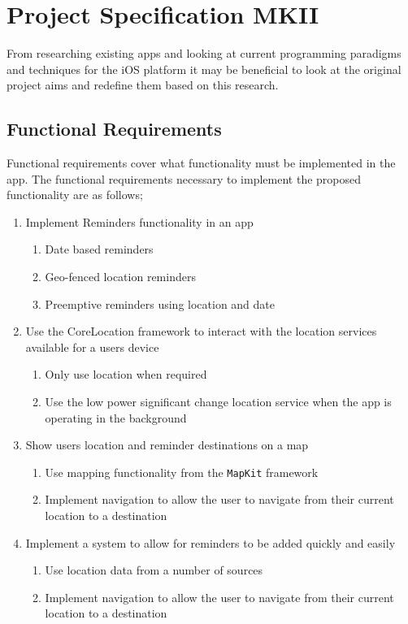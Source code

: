 \documentclass[12pt]{report}
\begin{document}
\chapter{Project Specification MKII}

From researching existing apps and looking at current programming paradigms and techniques for the iOS platform it may be beneficial to look at the original project aims and redefine them based on this research.

\section{Functional Requirements}

Functional requirements cover what functionality must be implemented in the app. The functional requirements necessary to implement the proposed functionality are as follows;

\begin{enumerate}[label*=\arabic*.]

\item{Implement Reminders functionality in an app}
    \begin{enumerate}[label*=\arabic*.]
        \item{Date based reminders}
        \item{Geo-fenced location reminders}
        \item{Preemptive reminders using location and date}
    \end{enumerate}
    
\item{Use the CoreLocation framework to interact with the location services available for a users device}
    \begin{enumerate}[label*=\arabic*.]
        \item{Only use location when required}
        \item{Use the low power significant change location service when the app is operating in the background}
    \end{enumerate}
    
\item{Show users location and reminder destinations on a map}
    \begin{enumerate}[label*=\arabic*.]
        \item{Use mapping functionality from the \texttt{MapKit} framework}
        \item{Implement navigation to allow the user to navigate from their current location to a destination}
    \end{enumerate}
   
\item{Implement a system to allow for reminders to be added quickly and easily}
    \begin{enumerate}[label*=\arabic*.]
        \item{Use location data from a number of sources}
        \item{Implement navigation to allow the user to navigate from their current location to a destination}
    \end{enumerate}

\end{enumerate}
\end{document}
